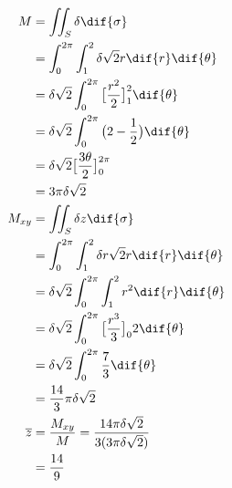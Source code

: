 \begin{align*}
M&=\iint_{S}\delta \dif{\sigma}\\
&=\int_{0}^{2\pi}\int_{1}^{2}\delta\sqrt{2}r\dif{r}\dif{\theta}\\
&=\delta\sqrt{2}\int_{0}^{2\pi}\big[\frac{r^2}{2}\big]_{1}^{2}\dif{\theta}\\
&=\delta\sqrt{2}\int_{0}^{2\pi}\big(2-\frac{1}{2}\big)\dif{\theta}\\
&=\delta\sqrt{2}\big[\frac{3\theta}{2}\big]_{0}^{2\pi}\\
&=3\pi\delta\sqrt{2}\\
M_{xy}&=\iint_{S}\delta z\dif{\sigma}\\
&=\int_{0}^{2\pi}\int_{1}^{2}\delta r\sqrt{2}r\dif{r}\dif{\theta}\\
&=\delta\sqrt{2}\int_{0}^{2\pi}\int_{1}^{2}r^{2}\dif{r}\dif{\theta}\\
&=\delta\sqrt{2}\int_{0}^{2\pi}\big[\frac{r^3}{3}\big]_{0}{2}\dif{\theta}\\
&=\delta\sqrt{2}\int_{0}^{2\pi}\frac{7}{3}\dif{\theta}\\
&=\frac{14}{3}\pi\delta\sqrt{2}\\
\overline z&=\frac{M_{xy}}{M}=\frac{14\pi\delta\sqrt{2}}{3(3\pi\delta\sqrt{2})}\\
&=\frac{14}{9}
\end{align*}

